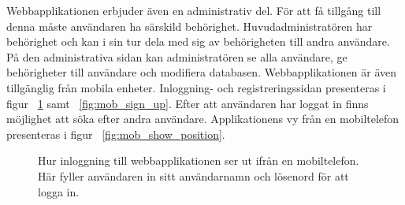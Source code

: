\documentclass[a4paper,12pt]{article}
\begin{document}
 Webbapplikationen erbjuder även en administrativ del. För att få tillgång till denna måste användaren ha särskild behörighet. Huvudadministratören har behörighet och kan i sin tur dela med sig av behörigheten till andra användare. På den administrativa sidan kan administratören se alla användare, ge behörigheter till användare och modifiera databasen.
 Webbapplikationen är även tillgänglig från mobila enheter. Inloggning- och registreringssidan presenteras i figur ~\ref{fig:mob_login} samt ~\ref{fig:mob_sign_up}. Efter att användaren har loggat in finns möjlighet att söka efter andra användare. Applikationens vy från en mobiltelefon presenteras i figur ~\ref{fig:mob_show_position}.

 \begin{figure}[H]
   \centering
   \caption{Hur inloggning till webbapplikationen ser ut ifrån en mobiltelefon. Här fyller användaren in sitt användarnamn och lösenord för att logga in.}
   \label{fig:mob_login}
 \end{figure}
\end{document}
